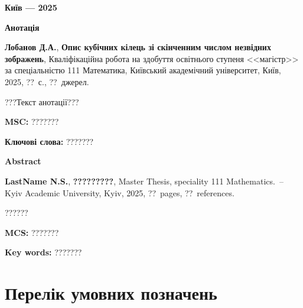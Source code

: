 \documentclass{thesis}
\begin{document}
\vfill

\centerline{\bf Київ --- 2025}

\newpage

\begin{center}
\Large \bf Анотація
\end{center}

\noindent
\textbf{Лобанов Д.А.}, \textbf{Опис кубічних кілець зі скінченним числом незвідних зображень}, Кваліфікаційна робота на здобуття освітнього ступеня <<магістр>> за спеціальністю 111 Математика, Київський академічний університет, Київ, 2025, ??~с., ??~джерел.

\bigskip


???Текст анотації???

\bigskip

\noindent
{\bf MSC:} ???????

\bigskip

\noindent
{\bf Ключові слова:} ???????
\bigskip

\newpage

\begin{center}
\Large \bf Abstract
\end{center}

\noindent
\textbf{LastName N.S.}, \textbf{?????????}, Master Thesis, speciality 111 Mathematics.~--
Kyiv Academic University, Kyiv, 2025, ??~pages, ??~references.

\bigskip
??????

\bigskip

\noindent
{\bf MCS:} ??????? %


\bigskip

\noindent
{\bf Key words:} ???????


\newpage


\tableofcontents

\newpage

\section*{Перелік умовних позначень}

\bigskip
\end{document}
